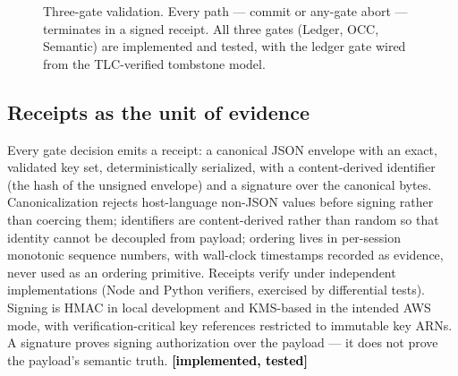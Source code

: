 \documentclass[10pt,twocolumn,letterpaper]{article}
\newcommand{\piR}{\pi_R}
\newcommand{\statusimpl}[0]{\textcolor{black}{\textbf{[implemented, tested]}}}
\begin{document}
\begin{figure}[t]
\centering
{}
\caption{Three-gate validation. Every path --- commit or any-gate abort ---
terminates in a signed receipt. All three gates (Ledger, OCC, Semantic) are implemented and tested, with the ledger gate wired from the TLC-verified tombstone model.}
\label{fig:pipeline}
\end{figure}

\subsection{Receipts as the unit of evidence}
\label{sec:receipts}

Every gate decision emits a receipt: a canonical JSON envelope with an exact,
validated key set, deterministically serialized, with a content-derived
identifier (the hash of the unsigned envelope) and a signature over the
canonical bytes. Canonicalization rejects host-language non-JSON values
before signing rather than coercing them; identifiers are content-derived
rather than random so that identity cannot be decoupled from payload;
ordering lives in per-session monotonic sequence numbers, with wall-clock
timestamps recorded as evidence, never used as an ordering primitive.
Receipts verify under independent implementations (Node and Python
verifiers, exercised by differential tests). Signing is HMAC in local
development and KMS-based in the intended AWS mode, with verification-critical
key references restricted to immutable key ARNs. A signature proves signing
authorization over the payload --- it does not prove the payload's semantic
truth. \statusimpl{}
\end{document}
